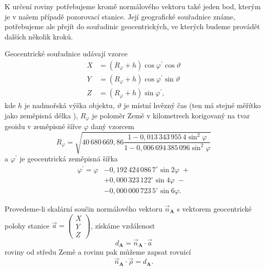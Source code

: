 \smallskip

K určení roviny potřebujeme kromě normálového vektoru také jeden bod, kterým je v našem případě pozorovací stanice. Její geografické souřadnice známe, potřebujeme ale přejít do souřadinic geocentrických, ve kterých budeme provádět dalších několik kroků.

Geocentrické souřadnice udávají vzorce \cite{ceplecha}
\begin{equation}
    \begin{aligned}
        X & =(R_\varphi+h)\cos{\varphi^\prime}\cos{\vartheta} \\
        Y & =(R_\varphi+h)\cos{\varphi^\prime}\sin{\vartheta} \\
        Z & =(R_\varphi+h)\sin{\varphi^\prime}\text{,}
    \end{aligned}
    \label{eqn:photo:geo_xyz}
\end{equation}
kde $h$ je nadmořská výška objektu, $\vartheta$ je místní hvězný čas (ten má stejné měřítko jako zeměpisná délka \cite{ceplecha}), $R_\varphi$ je poloměr Země v kilometrech korigovaný na tvar geoidu v zeměpisné šířce $\varphi$ daný vzorcem \cite{ceplecha}
\begin{equation}
    R_\varphi=\sqrt{40\,680\,669{,}86\frac{1-0{,}013\,343\,955\,4 \sin^2{\varphi}}{1-0{,}006\,694\,385\,096 \sin^2{\varphi}}}
\end{equation}
a $\varphi^\prime$ je geocentrická zeměpisná šířka \cite{ceplecha}
\begin{equation}
    \begin{aligned}
        \varphi^\prime=\varphi & -0{,}192\,424\,086\,7^\circ \sin{2\varphi}\;+      \\
                               & +0{,}000\,323\,122^\circ \sin{4\varphi}\;-         \\
                               & -0{,}000\,000\,723\,5^\circ \sin{6\varphi}\text{.}
    \end{aligned}
\end{equation}

Provedeme-li skalární součin normálového vektoru $\vec{n}_\mathbf{A}$ s vektorem geocentrické polohy stanice $\vec{a}=\left(\begin{smallmatrix}
            X\\Y\\Z
        \end{smallmatrix}\right)$, získáme vzdálenost
\begin{equation}
    d_\mathbf{A}=\vec{n}_\mathbf{A}\cdot\vec{a}
\end{equation}
roviny od středu Země \cite{ceplecha} a rovinu pak můžeme zapsat rovnicí \cite{ceplecha}
\begin{equation}
    \vec{n}_\mathbf{A}\cdot\vec{\rho}=d_\mathbf{A}\text{.}
    \label{eqn:photo:plane_a}
\end{equation}

